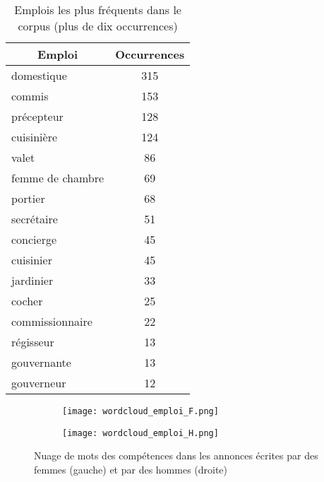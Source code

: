 {\begin{table}[ht]
	\centering
	\begin{tabular}{lc}
		\hline
		\multicolumn{1}{c}{\textbf{Emploi}} & \textbf{Occurrences} \\ \hline
		domestique                          & 315                  \\
		commis                              & 153                  \\
		précepteur                          & 128                  \\
		cuisinière                          & 124                  \\
		valet                               & 86                   \\
		femme de chambre                    & 69                   \\
		portier                             & 68                   \\
		secrétaire                          & 51                   \\
		concierge                           & 45                   \\
		cuisinier                           & 45                   \\
		jardinier                           & 33                   \\
		cocher                              & 25                   \\
		commissionnaire                     & 22                   \\
		régisseur                           & 13                   \\
		gouvernante                         & 13                   \\
		gouverneur                          & 12                  \\ \hline
	\end{tabular}
	\caption{Emplois les plus fréquents dans le corpus (plus de dix occurrences)}
\end{table}


\begin{figure}[ht]
	\centering
	\begin{subfigure}[b]{0.4\textwidth}
		\centering
		\texttt{[image: wordcloud\_emploi\_F.png]}
	\end{subfigure}
	\begin{subfigure}[b]{0.4\textwidth}
		\centering
		\texttt{[image: wordcloud\_emploi\_H.png]}
	\end{subfigure}
	\caption{Nuage de mots des compétences dans les annonces écrites par des femmes (gauche) et par des hommes (droite)}
\end{figure}


}
